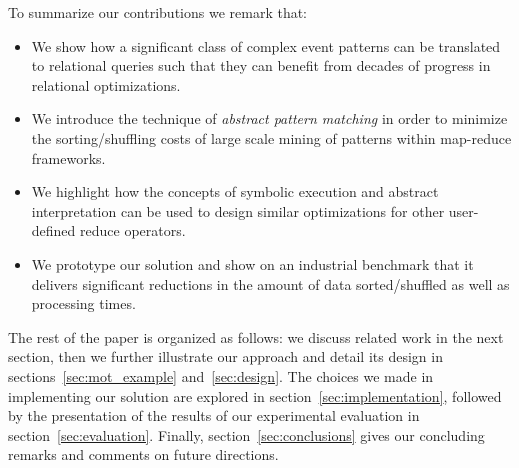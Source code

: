 To summarize our contributions we remark that:
\begin{itemize}
	\item We show how a significant class of complex event patterns can be 
	translated to relational queries such that they can benefit from decades of 
	progress in relational optimizations.
	\item We introduce the technique of {\em abstract pattern matching} in 
	order to minimize the sorting/shuffling costs of large scale mining of 
	patterns within map-reduce frameworks.
	\item We highlight how the concepts of symbolic execution and abstract 
	interpretation can be used to design similar optimizations for other 
	user-defined reduce operators.
	\item We prototype our solution and show on an industrial benchmark that 
	it delivers significant reductions in the amount of data sorted/shuffled as 
	well as processing times.  
\end{itemize}


The rest of the paper is organized as follows: we discuss related work in the 
next section, then we further illustrate our approach and detail its design in 
sections~\ref{sec:mot_example} and~\ref{sec:design}. 
The choices we made in implementing our solution are explored in 
section~\ref{sec:implementation}, followed by the presentation of the results 
of our experimental evaluation in section~\ref{sec:evaluation}. 
Finally, section~\ref{sec:conclusions} gives our concluding remarks and 
comments on future directions.   


